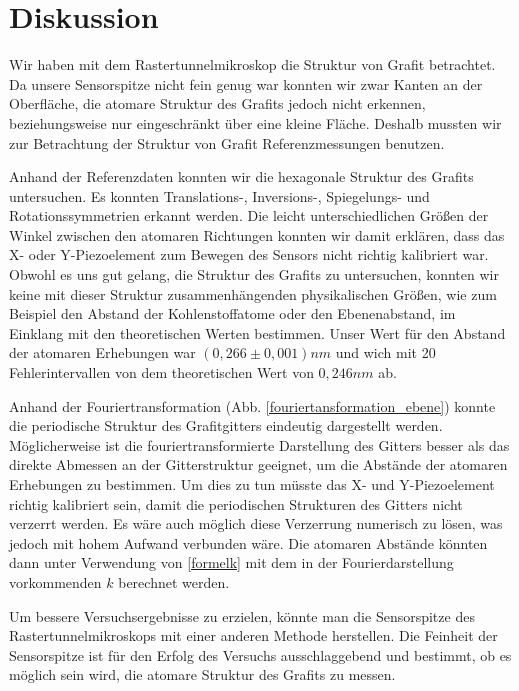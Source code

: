 \documentclass[10pt,a4paper]{article}
\begin{document}
\section{Diskussion}

Wir haben mit dem Rastertunnelmikroskop die Struktur von Grafit betrachtet. Da unsere Sensorspitze nicht fein genug war konnten wir zwar Kanten an der Oberfläche, die atomare Struktur des Grafits jedoch nicht erkennen, beziehungsweise nur eingeschränkt über eine kleine Fläche. Deshalb mussten wir zur Betrachtung der Struktur von Grafit Referenzmessungen benutzen.

Anhand der Referenzdaten konnten wir die hexagonale Struktur des Grafits untersuchen. Es konnten Translations-, Inversions-, Spiegelungs- und Rotationssymmetrien erkannt werden. Die leicht unterschiedlichen Größen der Winkel zwischen den atomaren Richtungen konnten wir damit erklären, dass das X- oder Y-Piezoelement zum Bewegen des Sensors nicht richtig kalibriert war. Obwohl es uns gut gelang, die Struktur des Grafits zu untersuchen, konnten wir keine mit dieser Struktur zusammenhängenden physikalischen Größen, wie zum Beispiel den Abstand der Kohlenstoffatome oder den Ebenenabstand, im Einklang mit den theoretischen Werten bestimmen. Unser Wert für den Abstand der atomaren Erhebungen war $(0,266 \pm 0,001) nm$ und wich mit 20 Fehlerintervallen von dem theoretischen Wert von $0,246 nm$ ab.

Anhand der Fouriertransformation (Abb. \ref{fouriertansformation_ebene}) konnte die periodische Struktur des Grafitgitters eindeutig dargestellt werden. Möglicherweise ist die fouriertransformierte Darstellung des Gitters besser als das direkte Abmessen an der Gitterstruktur geeignet, um die Abstände der atomaren Erhebungen zu bestimmen. Um dies zu tun müsste das X- und Y-Piezoelement richtig kalibriert sein, damit die periodischen Strukturen des Gitters nicht verzerrt werden. Es wäre auch möglich diese Verzerrung numerisch zu lösen, was jedoch mit hohem Aufwand verbunden wäre. Die atomaren Abstände könnten dann unter Verwendung von \eqref{formelk} mit dem in der Fourierdarstellung vorkommenden $k$ berechnet werden.

Um bessere Versuchsergebnisse zu erzielen, könnte man die Sensorspitze des Rastertunnelmikroskops mit einer anderen Methode herstellen. Die Feinheit der Sensorspitze ist für den Erfolg des Versuchs ausschlaggebend und bestimmt, ob es möglich sein wird, die atomare Struktur des Grafits zu messen.
\end{document}
